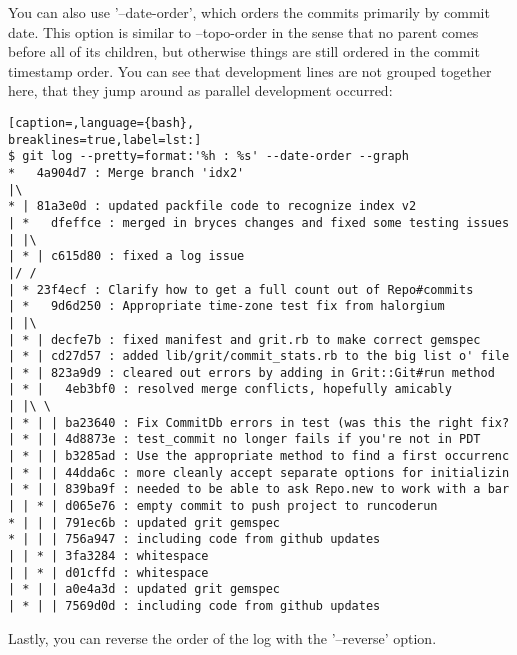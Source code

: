 You can also use '--date-order', which orders the commits primarily by commit
date. This option is similar to --topo-order in the sense that no parent comes
before all of its children, but otherwise things are still ordered in the
commit timestamp order. You can see that development lines are not grouped
together here, that they jump around as parallel development occurred:
\lstset{basicstyle=\scriptsize, numbers=none, captionpos=b, tabsize=4}
\begin{lstlisting}[caption=,language={bash},
breaklines=true,label=lst:]
$ git log --pretty=format:'%h : %s' --date-order --graph
*   4a904d7 : Merge branch 'idx2'
|\  
* | 81a3e0d : updated packfile code to recognize index v2
| *   dfeffce : merged in bryces changes and fixed some testing issues
| |\  
| * | c615d80 : fixed a log issue
|/ /  
| * 23f4ecf : Clarify how to get a full count out of Repo#commits
| *   9d6d250 : Appropriate time-zone test fix from halorgium
| |\  
| * | decfe7b : fixed manifest and grit.rb to make correct gemspec
| * | cd27d57 : added lib/grit/commit_stats.rb to the big list o' file
| * | 823a9d9 : cleared out errors by adding in Grit::Git#run method
| * |   4eb3bf0 : resolved merge conflicts, hopefully amicably
| |\ \  
| * | | ba23640 : Fix CommitDb errors in test (was this the right fix?
| * | | 4d8873e : test_commit no longer fails if you're not in PDT
| * | | b3285ad : Use the appropriate method to find a first occurrenc
| * | | 44dda6c : more cleanly accept separate options for initializin
| * | | 839ba9f : needed to be able to ask Repo.new to work with a bar
| | * | d065e76 : empty commit to push project to runcoderun
* | | | 791ec6b : updated grit gemspec
* | | | 756a947 : including code from github updates
| | * | 3fa3284 : whitespace
| | * | d01cffd : whitespace
| * | | a0e4a3d : updated grit gemspec
| * | | 7569d0d : including code from github updates
\end{lstlisting}

Lastly, you can reverse the order of the log with the '--reverse' option.
